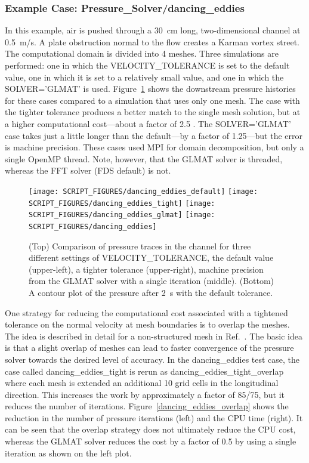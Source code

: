 \documentclass[11pt]{book}
\begin{document}
\subsubsection{Example Case: Pressure\_Solver/dancing\_eddies}

In this example, air is pushed through a 30~cm long, two-dimensional channel at 0.5~m/s. A plate obstruction normal to the flow creates a Karman vortex street. The computational domain is divided into 4 meshes. Three simulations are performed: one in which the {\ct VELOCITY\_TOLERANCE} is set to the default value, one in which it is set to a relatively small value, and one in which the {\ct SOLVER='GLMAT'} is used. Figure~\ref{dancing_eddies} shows the downstream pressure histories for these cases compared to a simulation that uses only one mesh. The case with the tighter tolerance produces a better match to the single mesh solution, but at a higher computational cost---about a factor of 2.5 .  The {\ct SOLVER='GLMAT'} case takes just a little longer than the default---by a factor of 1.25---but the error is machine precision.  These cases used MPI for domain decomposition, but only a single OpenMP thread.  Note, however, that the GLMAT solver is threaded, whereas the FFT solver (FDS default) is not.

\begin{figure}[ht]
\begin{center}
\texttt{[image: SCRIPT\_FIGURES/dancing\_eddies\_default]}
\texttt{[image: SCRIPT\_FIGURES/dancing\_eddies\_tight]}
\texttt{[image: SCRIPT\_FIGURES/dancing\_eddies\_glmat]}
\texttt{[image: SCRIPT\_FIGURES/dancing\_eddies]}
\end{center}
\caption[Results of the {\ct dancing\_eddies} test cases]{(Top) Comparison of pressure traces in the channel for three different settings of {\ct VELOCITY\_TOLERANCE}, the default value (upper-left), a tighter tolerance (upper-right), machine precision from the GLMAT solver with a single iteration (middle). (Bottom) A contour plot of the pressure after 2~s with the default tolerance.}
\label{dancing_eddies}
\end{figure}

One strategy for reducing the computational cost associated with a tightened tolerance on the normal velocity at mesh boundaries is to overlap the meshes. The idea is described in detail for a non-structured mesh in Ref.~\cite{Grinberg:JCP2010}. The basic idea is that a slight overlap of meshes can lead to faster convergence of the pressure solver towards the desired level of accuracy. In the {\ct dancing\_eddies} test case, the case called {\ct dancing\_eddies\_tight} is rerun as {\ct dancing\_eddies\_tight\_overlap} where each mesh is extended an additional 10 grid cells in the longitudinal direction. This increases the work by approximately a factor of 85/75, but it reduces the number of iterations. Figure~\ref{dancing_eddies_overlap} shows the reduction in the number of pressure iterations (left) and the CPU time (right).  It can be seen that the overlap strategy does not ultimately reduce the CPU cost, whereas the GLMAT solver reduces the cost by a factor of 0.5 by using a single iteration as shown on the left plot.
\end{document}
